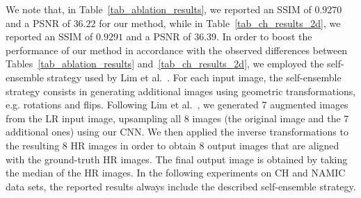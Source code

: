 \documentclass{ieeeaccess}
\begin{document}
We note that, in Table~\ref{tab_ablation_results}, we reported an SSIM of $0.9270$ and a PSNR of $36.22$ for our method, while in Table~\ref{tab_ch_results_2d}, we reported an SSIM of $0.9291$ and a PSNR of $36.39$. In order to boost the performance of our method in accordance with the observed differences between Tables~\ref{tab_ablation_results} and~\ref{tab_ch_results_2d}, we employed the self-ensemble strategy used by Lim et al.~\cite{Lim-CVPRW-2017}. For each input image, the self-ensemble strategy consists in generating additional images using geometric transformations, e.g. rotations and flips. Following Lim et al.~\cite{Lim-CVPRW-2017}, we generated 7 augmented images from the LR input image, upsampling all 8 images (the original image and the 7 additional ones) using our CNN. We then applied the inverse transformations to the resulting 8 HR images in order to obtain 8 output images that are aligned with the ground-truth HR images. The final output image is obtained by taking the median of the HR images. In the following experiments on CH and NAMIC data sets, the reported results always include the described self-ensemble strategy.
\end{document}
